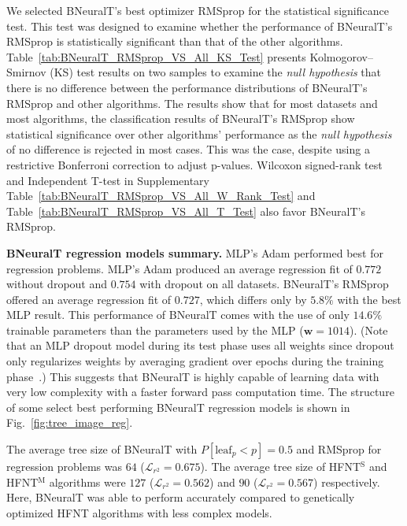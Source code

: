 \documentclass[11pt,a4paper]{article}
\begin{document}
    We selected BNeuralT's best optimizer RMSprop for the statistical significance test. This test was designed to examine whether the performance of BNeuralT's RMSprop is statistically significant than that of the other algorithms.  Table~\ref{tab:BNeuralT_RMSprop_VS_All_KS_Test} presents Kolmogorov–Smirnov (KS) test results on two samples to examine the \textit{null hypothesis} that there is no difference between the performance distributions of BNeuralT's RMSprop and other algorithms. The results show that for most datasets and most algorithms, the classification results of BNeuralT's RMSprop show statistical significance over other algorithms' performance as the \textit{null hypothesis} of no difference is rejected in most cases. This was the case, despite using a restrictive Bonferroni correction to adjust p-values. Wilcoxon signed-rank test and Independent T-test in Supplementary Table~\ref{tab:BNeuralT_RMSprop_VS_All_W_Rank_Test} and Table~\ref{tab:BNeuralT_RMSprop_VS_All_T_Test} also favor BNeuralT's RMSprop.
    
    \textbf{BNeuralT regression models summary.}  
    MLP's Adam performed best for regression problems. MLP's Adam produced an average regression fit of $0.772$ without dropout and $0.754$ with dropout on all datasets. BNeuralT's RMSprop offered an average regression fit of $0.727$, which differs only by $5.8\%$ with the best MLP result. This performance of  BNeuralT comes with the use of only $14.6\%$ trainable parameters than the parameters used by the MLP ($\textbf{w} = 1014$). (Note that an MLP dropout model during its test phase uses all weights since dropout only regularizes weights by averaging gradient over epochs during the training phase~\citep{srivastava14aJMLR}.) This suggests that BNeuralT is highly capable of learning data with very low complexity with a faster forward pass computation time. The structure of some select best performing BNeuralT regression models is shown in Fig.~\ref{fig:tree_image_reg}.


    The average tree size of BNeuralT with $ P[\text{leaf}_{p} < p] = 0.5$ and RMSprop for regression problems was $64$ ($\mathcal{L}_{r^2} = 0.675$). The average tree size of HFNT$^{\text{S}}$ and HFNT$^{\text{M}}$ algorithms were $127$ ($\mathcal{L}_{r^2} = 0.562$) and $90$ ($\mathcal{L}_{r^2} = 0.567$) respectively. Here, BNeuralT was able to perform accurately compared to genetically optimized HFNT algorithms with less complex models.
    
\end{document}
